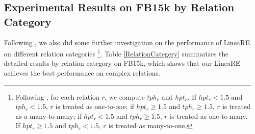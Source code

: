\documentclass[conference]{IEEEtran}
\begin{document}
\subsection{Experimental Results on FB15k by Relation Category}
Following \cite{TransE,TransH,TransD,DistMult,RotatE}, we also did some further investigation on the performance of LineaRE on different relation categories
\footnote{
	Following \cite{TransH}, for each relation $r$, we compute $tph_r$ and $hpt_r$. If $hpt_r < 1.5$ and $tph_r < 1.5$, $r$ is treated as one-to-one; if $hpt_r \geq 1.5$ and $tph_r \geq 1.5$, $r$ is treated as a many-to-many; if $hpt_r < 1.5$ and $tph_r \geq 1.5$, $r$ is treated as one-to-many. If $hpt_r \geq 1.5$ and $tph_r < 1.5$, $r$ is treated as many-to-one.
}.
Table \ref{RelationCategery} summarizes the detailed results by relation category
on FB15k, which shows that our LineaRE achieves the best performance on complex relations.
\end{document}
